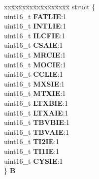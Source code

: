 \begin{DoxyCompactItemize}
\begin{tabbing}
\end{tabbing}\item 
\mbox{\label{unionuPIER0_a0970ef435a0b5780836d6bc0a4993675}} 
\begin{tabbing}
xx\=xx\=xx\=xx\=xx\=xx\=xx\=xx\=xx\=\kill
struct \{\\
\>uint16\_t {\bfseries FATLIE}:1\\
\>uint16\_t {\bfseries INTLIE}:1\\
\>uint16\_t {\bfseries ILCFIE}:1\\
\>uint16\_t {\bfseries CSAIE}:1\\
\>uint16\_t {\bfseries MRCIE}:1\\
\>uint16\_t {\bfseries MOCIE}:1\\
\>uint16\_t {\bfseries CCLIE}:1\\
\>uint16\_t {\bfseries MXSIE}:1\\
\>uint16\_t {\bfseries MTXIE}:1\\
\>uint16\_t {\bfseries LTXBIE}:1\\
\>uint16\_t {\bfseries LTXAIE}:1\\
\>uint16\_t {\bfseries TBVBIE}:1\\
\>uint16\_t {\bfseries TBVAIE}:1\\
\>uint16\_t {\bfseries TI2IE}:1\\
\>uint16\_t {\bfseries TI1IE}:1\\
\>uint16\_t {\bfseries CYSIE}:1\\
\} {\bfseries B}\\


\end{tabbing}
\end{DoxyCompactItemize}
